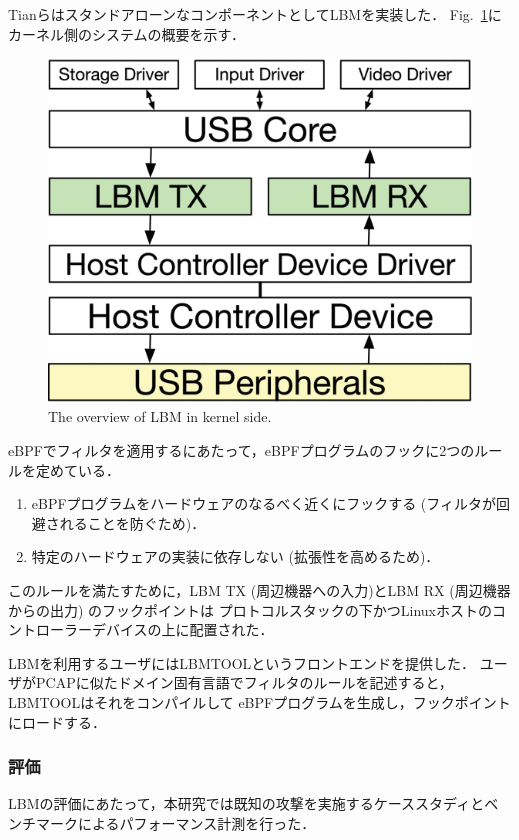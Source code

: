 \documentclass[platex,a4j,10pt,twoside,twocolumn,dvipdfmx]{jsarticle}
\newcommand{\Fref}[1]{Fig.~\ref{#1}}
\begin{document}
      TianらはスタンドアローンなコンポーネントとしてLBMを実装した．
      \Fref{img:kernel-design}にカーネル側のシステムの概要を示す．
      \begin{figure}[tp]
        \begin{center}
          \includegraphics[width=\columnwidth]{./img/sodapdf-converted.png}
        \end{center}
        \caption{The overview of LBM in kernel side. \cite{tian2019lbm}}
        \label{img:kernel-design}
      \end{figure}
      eBPFでフィルタを適用するにあたって，eBPFプログラムのフックに2つのルールを定めている．
      \begin{enumerate}
          \item eBPFプログラムをハードウェアのなるべく近くにフックする (フィルタが回避されることを防ぐため)．
          \item 特定のハードウェアの実装に依存しない (拡張性を高めるため)．
      \end{enumerate}
      このルールを満たすために，LBM TX (周辺機器への入力)とLBM RX (周辺機器からの出力) のフックポイントは
      プロトコルスタックの下かつLinuxホストのコントローラーデバイスの上に配置された．
      
      LBMを利用するユーザにはLBMTOOLというフロントエンドを提供した．
      ユーザがPCAPに似たドメイン固有言語でフィルタのルールを記述すると，LBMTOOLはそれをコンパイルして
      eBPFプログラムを生成し，フックポイントにロードする．
      
    \subsubsection{評価}
      LBMの評価にあたって，本研究では既知の攻撃を実施するケーススタディとベンチマークによるパフォーマンス計測を行った．
\end{document}
